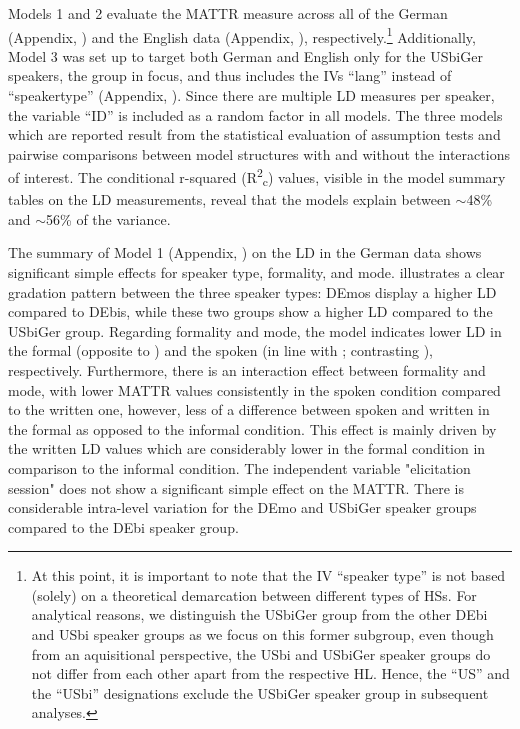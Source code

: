 \documentclass[output=paper,colorlinks,citecolor=brown]{langscibook}
\begin{document}
Models 1 and 2 evaluate the MATTR measure across all of the German (Appendix, ) and the English data (Appendix, ), respectively.\footnote{At this point, it is important to note that the IV ``speaker type'' is not based (solely) on a theoretical demarcation between different types of HSs. For analytical reasons, we distinguish the USbiGer group from the other DEbi and USbi speaker groups as we focus on this former subgroup, even though from an aquisitional perspective, the USbi and USbiGer speaker groups do not differ from each other apart from the respective HL. Hence, the ``US'' and the ``USbi'' designations exclude the USbiGer speaker group in subsequent analyses.} Additionally, Model 3 was set up to target both German and English only for the USbiGer speakers, the group in focus, and thus includes the IVs ``lang'' instead of ``speakertype'' (Appendix, ). Since there are multiple LD measures per speaker, the variable ``ID'' is included as a random factor in all models. The three models which are reported result from the statistical evaluation of assumption tests and pairwise comparisons between model structures with and without the interactions of interest. The conditional r-squared (R\textsuperscript{2}\textsubscript{c}) values, visible in the model summary tables on the LD measurements, reveal that the models explain between $\sim$48\% and $\sim$56\% of the variance. 

The summary of Model 1 (Appendix, ) on the LD in the German data shows significant simple effects for speaker type, formality, and mode.  illustrates a clear gradation pattern between the three speaker types: DEmos display a higher LD compared to DEbis, while these two groups show a higher LD compared to the USbiGer group. Regarding formality and mode, the model indicates lower LD in the formal (opposite to \citealt{VanGijselSpeelmanGeeraerts2005Richness, Alamillo2019LexicalSkills}) and the spoken (in line with \citealt{VanGijselSpeelmanGeeraerts2005Richness}; contrasting \citealt{Yu2009LDWritingSpeaking}), respectively. Furthermore, there is an interaction effect between formality and mode, with lower MATTR values consistently in the spoken condition compared to the written one, however, less of a difference between spoken and written in the formal as opposed to the informal condition. This effect is mainly driven by the written LD values which are considerably lower in the formal condition in comparison to the informal condition. The independent variable "elicitation session" does not show a significant simple effect on the MATTR. There is considerable intra-level variation for the DEmo and USbiGer speaker groups compared to the DEbi speaker group.
\end{document}
